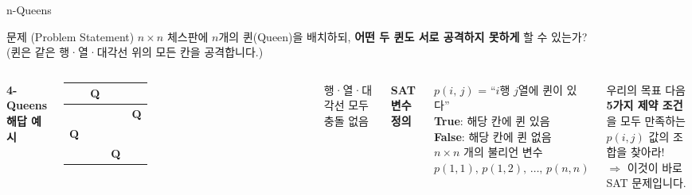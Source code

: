 \documentclass[10.5pt,compress]{beamer}
\newcommand{\Qcell}{\cellcolor{lightamber!80}\textcolor{amber}{\textbf{Q}}}
\begin{document}
\begin{frame}[t]{n-Queens}
    \footnotesize
    \begin{block}{문제 (Problem Statement)}
        $n \times n$ 체스판에 $n$개의 퀸(Queen)을 배치하되,
        \textbf{어떤 두 퀸도 서로 공격하지 못하게} 할 수 있는가?\\
        \scriptsize (퀸은 같은 행·열·대각선 위의 모든 칸을 공격합니다.)
    \end{block}

    \vspace{0.12cm}
    \begin{columns}[T]
        \textbf{4-Queens 해답 예시}
        \vspace{0.08cm}

        \centering
        \setlength{\tabcolsep}{4pt}
        \renewcommand{\arraystretch}{1.4}
        \scriptsize
        \begin{tabular}{|c|c|c|c|}
            \hline
            \cellcolor{gray!20} & \Qcell & \cellcolor{gray!20} & \cellcolor{white} \\
            \hline
            \cellcolor{white} & \cellcolor{gray!20} & \cellcolor{white} & \Qcell \\
            \hline
            \Qcell & \cellcolor{white} & \cellcolor{gray!20} & \cellcolor{white} \\
            \hline
            \cellcolor{gray!20} & \cellcolor{white} & \Qcell & \cellcolor{gray!20} \\
            \hline
        \end{tabular}
        \renewcommand{\arraystretch}{1}

        \vspace{0.08cm}
        \scriptsize\centering 행·열·대각선 모두 충돌 없음

        \textbf{SAT 변수 정의}

        \begin{exampleblock}{}
            \footnotesize
            $p(i,\, j)$ = ``$i$행 $j$열에 퀸이 있다''\\[3pt]
            \scriptsize
            \textbf{True}: 해당 칸에 퀸 있음\\
            \textbf{False}: 해당 칸에 퀸 없음\\[4pt]
            $n \times n$ 개의 불리언 변수 $p(1,1),\, p(1,2),\, \ldots,\, p(n,n)$
        \end{exampleblock}

        \begin{block}{우리의 목표}
            \footnotesize 다음 \textbf{5가지 제약 조건}을 모두 만족하는\\
            $p(i,j)$ 값의 조합을 찾아라!\\[2pt]
            \scriptsize $\Rightarrow$ 이것이 바로 SAT 문제입니다.
        \end{block}
    \end{columns}
\end{frame}
\end{document}
